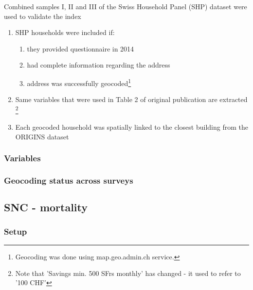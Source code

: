 \documentclass[a4paper, notitlepage, fleqn]{article} %
\begin{document}
Combined samples I, II and III of the Swiss Household Panel (SHP) dataset were used to validate the index

\begin{enumerate}

	\item SHP households were included if: 

	\begin{enumerate}	
		\item they provided questionnaire in 2014 
		\item had complete information regarding the address
		\item address was successfully geocoded\footnote{Geocoding was done using map.geo.admin.ch service.}
	\end{enumerate}	
		
	\item Same variables that were used in Table 2 of original publication are extracted
		\footnote{Note that 'Savings min. 500 SFrs monthly' has changed - it used to refer to '100 CHF'}	
		
	\item Each geocoded household was spatially linked to the closest building from the ORIGINS dataset 
\end{enumerate}
\subsubsection{Variables}
\begin{stlog}\end{stlog}
\subsubsection{Geocoding status across surveys}
\begin{stlog}\end{stlog}
\newpage
\subsection{SNC - mortality}

\subsubsection{Setup}
\end{document}
